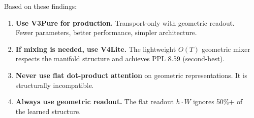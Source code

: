 \documentclass[11pt,a4paper]{article}
\theoremstyle{definition}
\theoremstyle{remark}
\begin{document}
Based on these findings:

\begin{enumerate}[label=\textbf{R\arabic*.}]
    \item \textbf{Use V3Pure for production.} Transport-only 
    with geometric readout. Fewer parameters, better performance, 
    simpler architecture.
    
    \item \textbf{If mixing is needed, use V4Lite.} The 
    lightweight $O(T)$ geometric mixer respects the manifold 
    structure and achieves PPL 8.59 (second-best).
    
    \item \textbf{Never use flat dot-product attention} on 
    geometric representations. It is structurally incompatible.
    
    \item \textbf{Always use geometric readout.} The flat 
    readout $h \cdot W$ ignores 50\%+ of the learned structure.
\end{enumerate}
\end{document}
